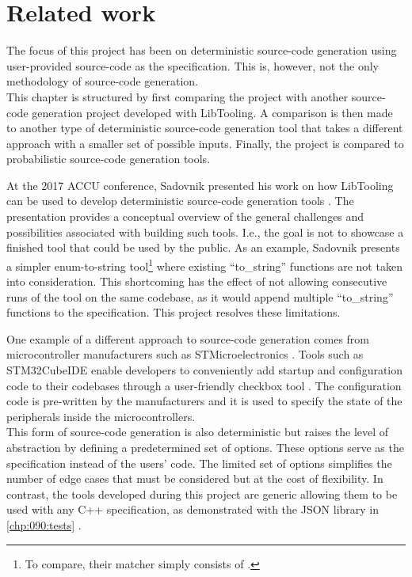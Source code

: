 \chapter{Related work}

The focus of this project has been on deterministic source-code generation using user-provided source-code as the specification. This is, however, not the only methodology of source-code generation.\\
This chapter is structured by first comparing the project with another source-code generation project developed with LibTooling.
A comparison is then made to another type of deterministic source-code generation tool that takes a different approach with a smaller set of possible inputs.
Finally, the project is compared to probabilistic source-code generation tools.

At the 2017 ACCU conference, Sadovnik presented his work on how LibTooling can be used to develop deterministic source-code generation tools \cite{sadovnikovUsingClangSource}.
The presentation provides a conceptual overview of the general challenges and possibilities associated with building such tools. I.e., the goal is not to showcase a finished tool that could be used by the public.
As an example, Sadovnik presents a simpler enum-to-string tool\footnote{
    To compare, their matcher simply consists of .
} where existing ``to\_string'' functions are not taken into consideration.
This shortcoming has the effect of not allowing consecutive runs of the tool on the same codebase, as it would append multiple ``to\_string'' functions to the specification.
This project resolves these limitations.

One example of a different approach to source-code generation comes from microcontroller manufacturers such as STMicroelectronics \cite{stmSTMicroelectronicsOurTechnology}.
Tools such as STM32CubeIDE enable developers to conveniently add startup and configuration code to their codebases through a user-friendly checkbox tool \cite{stmSTM32CubeDevelopmentSoftware}.
The configuration code is pre-written by the manufacturers and it is used to specify the state of the peripherals inside the microcontrollers.\\
This form of source-code generation is also deterministic but raises the level of abstraction by defining a predetermined set of options. These options serve as the specification instead of the users' code.
The limited set of options simplifies the number of edge cases that must be considered but at the cost of flexibility.
In contrast, the tools developed during this project are generic allowing them to be used with any C++ specification, as demonstrated with the JSON library in \cref{chp:090:tests} \cite{lohmannJSONModern2022}.

